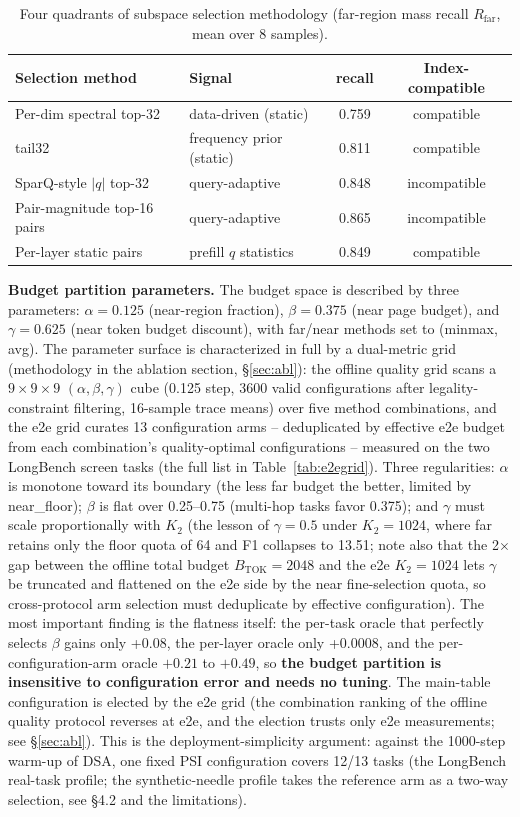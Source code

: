 \documentclass[11pt]{article}
\begin{document}
\begin{table}[h]\centering
\caption{Four quadrants of subspace selection methodology (far-region mass recall $R_{\mathrm{far}}$, mean over 8 samples).}
\label{tab:select}
\begin{tabular}{llcc}
\toprule
Selection method & Signal & recall & Index-compatible \\
\midrule
Per-dim spectral top-32 & data-driven (static) & 0.759 & compatible \\
tail32 & frequency prior (static) & 0.811 & compatible \\
SparQ-style $|q|$ top-32 & query-adaptive & 0.848 & incompatible \\
Pair-magnitude top-16 pairs & query-adaptive & 0.865 & incompatible \\
Per-layer static pairs & prefill $q$ statistics & 0.849 & compatible \\
\bottomrule
\end{tabular}
\end{table}

\textbf{Budget partition parameters.} The budget space is described by three parameters: $\alpha{=}0.125$ (near-region fraction), $\beta{=}0.375$ (near page budget), and $\gamma{=}0.625$ (near token budget discount), with far/near methods set to (minmax, avg). The parameter surface is characterized in full by a dual-metric grid (methodology in the ablation section, \S\ref{sec:abl}): the offline quality grid scans a $9\times9\times9$ $(\alpha,\beta,\gamma)$ cube (0.125 step, 3600 valid configurations after legality-constraint filtering, 16-sample trace means) over five method combinations, and the e2e grid curates 13 configuration arms -- deduplicated by effective e2e budget from each combination's quality-optimal configurations -- measured on the two LongBench screen tasks (the full list in Table~\ref{tab:e2egrid}). Three regularities: $\alpha$ is monotone toward its boundary (the less far budget the better, limited by near\_floor); $\beta$ is flat over 0.25--0.75 (multi-hop tasks favor 0.375); and $\gamma$ must scale proportionally with $K_2$ (the lesson of $\gamma{=}0.5$ under $K_2{=}1024$, where far retains only the floor quota of 64 and F1 collapses to 13.51; note also that the 2$\times$ gap between the offline total budget $B_{\mathrm{TOK}}{=}2048$ and the e2e $K_2{=}1024$ lets $\gamma$ be truncated and flattened on the e2e side by the near fine-selection quota, so cross-protocol arm selection must deduplicate by effective configuration). The most important finding is the flatness itself: the per-task oracle that perfectly selects $\beta$ gains only +0.08, the per-layer oracle only +0.0008, and the per-configuration-arm oracle $+0.21$ to $+0.49$, so \textbf{the budget partition is insensitive to configuration error and needs no tuning}. The main-table configuration is elected by the e2e grid (the combination ranking of the offline quality protocol reverses at e2e, and the election trusts only e2e measurements; see \S\ref{sec:abl}). This is the deployment-simplicity argument: against the 1000-step warm-up of DSA, one fixed PSI configuration covers 12/13 tasks (the LongBench real-task profile; the synthetic-needle profile takes the reference arm as a two-way selection, see \S4.2 and the limitations).
\end{document}
